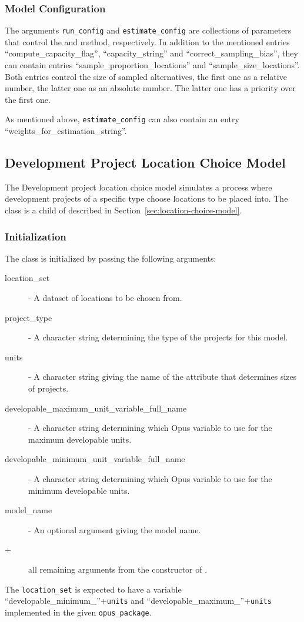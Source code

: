 %
\subsubsection{Model Configuration}
\modelsindex
%
The arguments \verb|run_config| and \verb|estimate_config| are collections of
parameters that control the  and  method,
respectively. In addition to the mentioned entries ``compute_capacity_flag'',
``capacity_string'' and ``correct_sampling_bias'', they can contain entries
``sample_proportion_locations'' and ``sample_size_locations''. Both entries
control the size of sampled alternatives, the first one as a relative number,
the latter one as an absolute number. The latter one has a priority over the
first one.

As mentioned above, \verb|estimate_config| can also contain an entry ``weights_for_estimation_string''.


\subsection{Development Project Location Choice Model}
\label{sec:development-project-lcm}
%
The Development project location choice model \modelsindex simulates a process where
development projects of a specific type choose locations to be placed into.
The class  \modelsindex is a child of
 \modelsindex described in
Section~\ref{sec:location-choice-model}.

\subsubsection{Initialization}
%
The class is initialized by passing the following arguments:
\begin{description}
\item[location_set] - A dataset \datasetindex of locations to be chosen from.
\item[project_type] - A character string determining the type of the projects
  for this model. \modelsindex
\item[units] - A character string giving the name of the attribute \attributesindex that
  determines sizes of projects.
\item[developable_maximum_unit_variable_full_name] \variablesindex -  A character string determining
  which Opus variable \variablesindex to use for the maximum developable units.
\item[developable_minimum_unit_variable_full_name] \variablesindex -  A character string determining
  which Opus variable \variablesindex to use for the minimum developable units.
\item[model_name] \modelsindex - An optional argument giving the model \modelsindex name.
\item[+] all remaining arguments from the constructor of
  . \modelsindex
\end{description}
The \verb|location_set| is expected to have a variable \variablesindex
``developable_minimum_''+\verb|units| and ``developable_maximum_''+\verb|units|
implemented in the given \verb|opus_package|.


